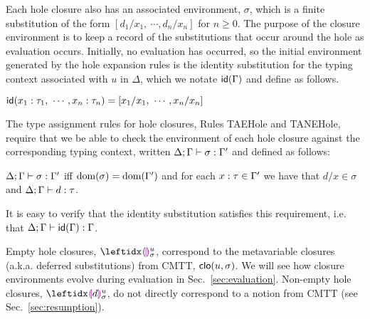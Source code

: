 Each hole closure also has an associated environment, $\sigma$, which is a finite substitution of the form $[d_1/x_1, ~\cdots, d_n/x_n]$ for $n \geq 0$. 
The purpose of the closure environment is to keep a record of the substitutions that occur around the hole as evaluation occurs. 
Initially, no evaluation has occurred, so the initial environment generated by the hole expansion rules is the identity substitution for the typing context associated with $u$ in $\Delta$, which we notate $\mathsf{id}(\Gamma)$ and define as follows.
\begin{defn} $\mathsf{id}(x_1 : \tau_1, ~\cdots, x_n : \tau_n) = [x_1/x_1, ~\cdots, x_n/x_n]$
\end{defn}
\noindent
The type assignment rules for hole closures, Rules TAEHole and TANEHole, require that we be able to check the environment of each hole closure against the corresponding typing context, written $\Delta; \Gamma \vdash \sigma : \Gamma'$ and defined as follows:
\begin{defn}
$\Delta; \Gamma \vdash \sigma : \Gamma'$ iff $\text{dom}(\sigma) = \text{dom}(\Gamma')$ and for each $x : \tau \in \Gamma'$ we have that $d/x \in \sigma$ and $\Delta; \Gamma \vdash d : \tau$.
\end{defn}
\noindent
It is easy to verify that the identity substitution satisfies this requirement, i.e. that $\Delta; \Gamma \vdash \mathsf{id}(\Gamma) : \Gamma$. 

Empty hole closures, $\dehole{u}{\sigma}{}$,  correspond to the metavariable closures (a.k.a. deferred substitutions) from CMTT, $\mathsf{clo}(u, \sigma)$. 
We will see how closure environments evolve during evaluation in Sec.~\ref{sec:evaluation}. 
Non-empty hole closures, $\dhole{d}{u}{\sigma}{}$, do not directly correspond to a notion from CMTT (see Sec.~\ref{sec:resumption}).

